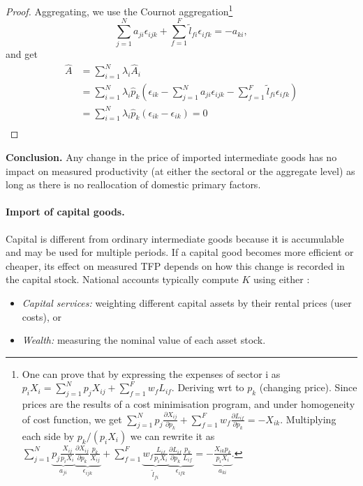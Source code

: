 \documentclass[11pt]{article}
\begin{document}
\begin{proof}
Aggregating, we use the Cournot aggregation\footnote{
One can prove that by expressing the expenses of sector i as $p_iX_i=\sum_{j=1}^N p_j X_{ij} +\sum_{f=1}^F  w_f L_{if}  $. Deriving wrt to $p_k$ (changing price). Since prices are the results of a cost minimisation program, and under homogeneity of cost function, we get
$\sum_{j=1}^N p_j \frac{\partial X_{ij}}{\partial p_k} +\sum_{f=1}^F  w_f\frac{\partial L_{if}}{\partial p_k}=-X_{ik}$. Multiplying each side by $p_k/(p_iX_i)$ we can rewrite it as
$\sum_{j=1}^N \underbrace{p_j \frac{X_{ij}}{p_iX_i}}_{a_{ji}} \underbrace{\frac{\partial X_{ij}}{\partial p_k}\frac{p_k}{X_{ij}}}_{\epsilon_{ijk}} +\sum_{f=1}^F  \underbrace{w_f \frac{L_{if}}{p_iX_i}}_{\tilde{l}_{fi}} \underbrace{\frac{\partial L_{if}}{\partial p_k}\frac{p_k}{L_{if}}}_{\epsilon_{ifk}}=-\underbrace{\frac{X_{ik}p_k}{p_iX_i}}_{a_{ki}}$.
} 
\begin{equation*}
    \sum_{j=1}^N a_{ji} \epsilon_{ijk} +\sum_{f=1}^F  \tilde{l}_{fi}\epsilon_{ifk} = - a_{ki},
\end{equation*}
and get
\begin{equation}
\label{eq_agg_prod_}
    \begin{aligned}
    \hat{A}&=\sum_{i=1}^N \lambda_i \hat{A}_i\\
    &=\sum_{i=1}^N \lambda_i  \hat{p}_{k}\left(
    \epsilon_{ik}-  \sum_{j=1}^N  a_{ji} \epsilon_{ijk}- \sum_{f=1}^F  \tilde{l}_{fi}\epsilon_{ifk}
    \right)\\
      &=\sum_{i=1}^N \lambda_i  \hat{p}_{k}\left(
    \epsilon_{ik}-\epsilon_{ik}
    \right)=0\\
\end{aligned}
\end{equation}

\end{proof}


\noindent
\textbf{Conclusion.} Any change in the price of imported intermediate goods has no impact 
on measured productivity (at either the sectoral or the aggregate level) as long as there 
is no reallocation of domestic primary factors.

\paragraph{Import of capital goods.}
Capital is different from ordinary intermediate goods because it is accumulable and may be 
used for multiple periods. If a capital good becomes more efficient or cheaper, its effect 
on measured TFP depends on how this change is recorded in the capital stock. National accounts 
typically compute $K$ using either \citep{oulton_measuring_2001}:
\begin{itemize}
    \item \textit{Capital services:} weighting different capital assets by their rental 
    prices (user costs), or
    \item \textit{Wealth:} measuring the nominal value of each asset stock.
\end{itemize}
\end{document}
